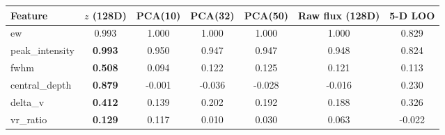 \begin{tabular}{lcccccc}
  \toprule
  Feature & $z$ (128D) & PCA(10) & PCA(32) & PCA(50) & Raw flux (128D) & 5-D LOO \\
  \midrule
  ew                   & 0.993 & 1.000 & 1.000 & 1.000 & 1.000 & 0.829 \\
  peak\_intensity      & \textbf{0.993} & 0.950 & 0.947 & 0.947 & 0.948 & 0.824 \\
  fwhm                 & \textbf{0.508} & 0.094 & 0.122 & 0.125 & 0.121 & 0.113 \\
  central\_depth       & \textbf{0.879} & -0.001 & -0.036 & -0.028 & -0.016 & 0.230 \\
  delta\_v             & \textbf{0.412} & 0.139 & 0.202 & 0.192 & 0.188 & 0.326 \\
  vr\_ratio            & \textbf{0.129} & 0.117 & 0.010 & 0.030 & 0.063 & -0.022 \\
  \bottomrule
\end{tabular}
